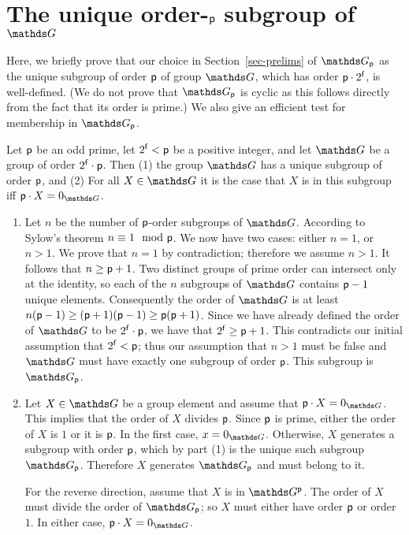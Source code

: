 \section{The unique order-$\mathsf{p}$ subgroup of $\group$}\label{apx:group}
Here, we briefly prove that our choice in Section~\ref{sec-prelims} of $\G_{\Prime}$ as the unique subgroup of order $\mathsf{p}$ of group $\G$, which has order $\mathsf{p} \cdot 2^{\mathsf{f}}$, is well-defined. (We do not prove that $\G_{\Prime}$ is cyclic as this follows directly from the fact that its order is prime.)
We also give an efficient test for membership in $\G_{\Prime}$.
 
    \begin{proposition}\label{pr-group} Let $\mathsf{p}$ be an odd prime, let $2^{\mathsf{f}} < \mathsf{p}$ be a positive integer, and let $\G$ be a group of order $2^{\mathsf{f}} \cdot \mathsf{p}$. Then (1) the group $\G$ has a unique subgroup of order $\mathsf{p}$, and (2) For all $X\in\group$ it is the case that $X$ is in this subgroup iff $\Prime\cdot X = 0_{\group}$.
    \end{proposition}
    
    \begin{enumerate}[label=(\arabic*)]
    \item Let $n$ be the number of $\mathsf{p}$-order subgroups of $\G$. According to Sylow's theorem $n \equiv 1 \mod {\mathsf{p}}$. We now have two cases: either $n = 1$, or $n > 1$. We prove that $n=1$ by contradiction; therefore we assume $n > 1$. It follows that $n \geq \mathsf{p} +1$. Two distinct groups of prime order can intersect only at the identity, so each of the $n$ subgroups of $\G$ contains $\mathsf{p}-1$ unique elements. Consequently the order of $\G$ is at least $n (\mathsf{p}-1) \geq (\mathsf{p}+1)(\mathsf{p} -1)  \geq \mathsf{p} (\mathsf{p}+1)$. Since we have already defined the order of $\G$ to be $2^{\mathsf{f}} \cdot \mathsf{p}$, we have that $2^{\mathsf{f}} \geq \mathsf{p}+ 1$. This contradicts our initial assumption that $2^{\mathsf{f}} < \mathsf{p}$; thus our assumption that $n>1$ must be false and $\G$ must have exactly one subgroup of order $\mathsf{p}$. This subgroup is $\G_{\Prime}$.
    
    \item Let $X \in \G$ be a group element and assume that $\Prime \cdot X = 0_{\G}$. This implies that the order of $X$ divides $\mathsf{p}$. Since $\mathsf{p}$ is prime, either the order of $X$ is $1$ or it is $\mathsf{p}$. In the first case, $x = 0_{\G}$. Otherwise, $X$ generates a subgroup with order $\mathsf{p}$, which by part (1) is the unique such subgroup $\G_{\Prime}$. Therefore $X$ generates $\G_{\Prime}$ and must belong to it.
    	
    For the reverse direction, assume that $X$ is in $\G^{\Prime}$. The order of $X$ must divide the order of $\G_{\Prime}$; so $X$ must either have order $\mathsf{p}$ or order $1$. In either case, $\Prime \cdot X = 0_{\G}$.
    \end{enumerate}